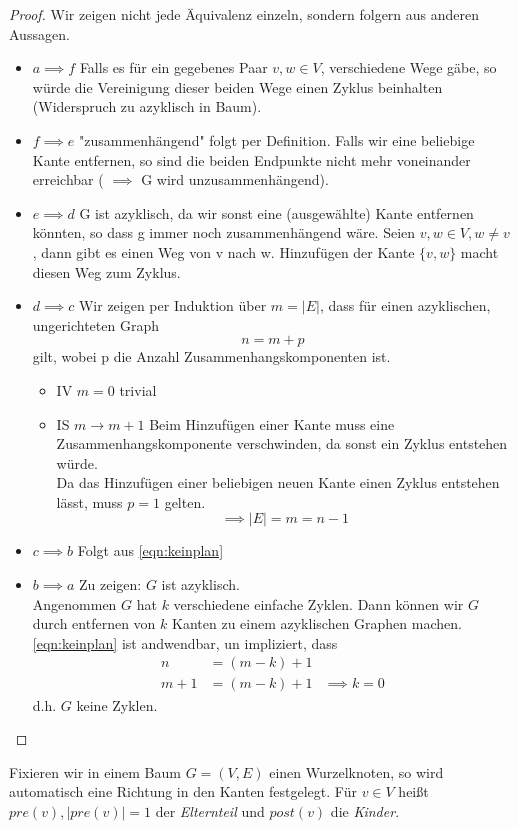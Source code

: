 \begin{proof}
Wir zeigen nicht jede Äquivalenz einzeln, sondern folgern aus anderen Aussagen.\begin{itemize}
	\item \underline{$a \implies f$} Falls es für ein gegebenes Paar $v,w \in  V$, verschiedene Wege gäbe, so würde die Vereinigung dieser beiden Wege einen Zyklus beinhalten (Widerspruch zu azyklisch in Baum).
	\item \underline{$f \implies e$} "zusammenhängend" folgt per Definition.
		Falls wir eine beliebige Kante entfernen, so sind die beiden Endpunkte nicht mehr voneinander erreichbar ( $\implies$ G wird unzusammenhängend).
	\item \underline{$e \implies d$} G ist azyklisch, da wir sonst eine (ausgewählte) Kante entfernen könnten, so dass g immer noch zusammenhängend wäre. Seien $v,w \in  V, w \neq v$, dann gibt es einen Weg von v nach w. 
	Hinzufügen der Kante $\{v,w\}$ macht diesen Weg zum Zyklus.
\item \underline{$d \implies c$} Wir zeigen per Induktion über $m= |E|$, dass für einen azyklischen, ungerichteten Graph
	\begin{equation}
	\label{eqn:keinplan}
		n=m+p
	\end{equation}
	gilt, wobei p die Anzahl Zusammenhangskomponenten ist.
	\begin{itemize}[label=$\lozenge$, itemsep=2ex]
		\item IV \underline{$m=0$} trivial
		\item IS \underline{$m \to m+1$} Beim Hinzufügen einer Kante muss eine Zusammenhangskomponente verschwinden, da sonst ein Zyklus entstehen würde. \\
	Da das Hinzufügen einer beliebigen neuen Kante einen Zyklus entstehen lässt, muss $p=1$ gelten.
	\[
	\implies |E|=m=n-1
	\]
	\end{itemize}
\item \underline{$c \implies b$} Folgt aus \eqref{eqn:keinplan}
\item \underline{$b \implies a$} Zu zeigen: $G$ ist azyklisch. \\
	Angenommen $G$ hat $k$ verschiedene einfache Zyklen. Dann können wir $G$ durch entfernen von $k$ Kanten zu einem azyklischen Graphen machen. \eqref{eqn:keinplan} ist andwendbar, un impliziert, dass 
	\begin{align*}
		n &= (m-k)+1 \\
		m+1 &= (m-k)+1 		    &\implies k=0
	\end{align*}
	d.h. $G$ keine Zyklen.
\end{itemize}
\end{proof}
\begin{remark}
Fixieren wir in einem Baum $G=(V,E)$ einen Wurzelknoten, so wird automatisch eine Richtung in den Kanten festgelegt. Für $v \in V$ heißt $pre(v), |pre(v)|=1$ der \emph{Elternteil} und $post(v)$ die \emph{Kinder}.
\end{remark}
